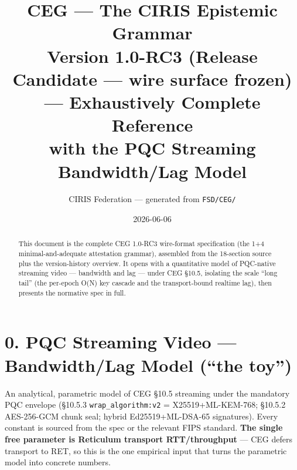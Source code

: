 \documentclass[10pt]{article}
\title{\textbf{CEG --- The CIRIS Epistemic Grammar}\\[4pt]\large Version 1.0-RC3 (Release Candidate --- wire surface frozen) --- Exhaustively Complete Reference\\[2pt]\normalsize with the PQC Streaming Bandwidth/Lag Model}
\author{CIRIS Federation --- generated from \texttt{FSD/CEG/}}
\date{2026-06-06}
\begin{document}
\maketitle
\begin{abstract}\noindent
This document is the complete CEG 1.0-RC3 wire-format specification (the 1+4
minimal-and-adequate attestation grammar), assembled from the 18-section source
plus the version-history overview. It opens with a quantitative model of
PQC-native streaming video --- bandwidth and lag --- under CEG \S10.5, isolating
the scale ``long tail'' (the per-epoch O(N) key cascade and the transport-bound
realtime lag), then presents the normative spec in full.
\end{abstract}
\tableofcontents
\clearpage


\section*{0. PQC Streaming Video --- Bandwidth/Lag Model (``the toy'')}

An analytical, parametric model of CEG \S10.5 streaming under the mandatory PQC
envelope (\S10.5.3 \texttt{wrap\_algorithm:v2} = X25519+ML-KEM-768; \S10.5.2
AES-256-GCM chunk seal; hybrid Ed25519+ML-DSA-65 signatures). Every constant is
sourced from the spec or the relevant FIPS standard. \textbf{The single free
parameter is Reticulum transport RTT/throughput} --- CEG defers transport to RET,
so this is the one empirical input that turns the parametric model into concrete
numbers.
\end{document}
